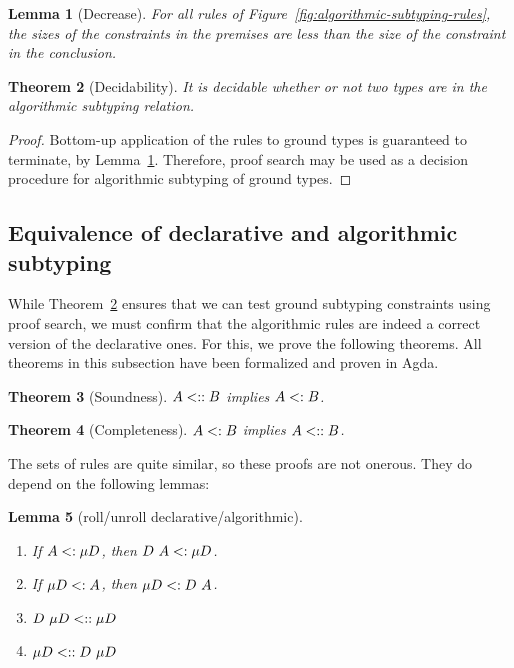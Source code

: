 \documentclass[pdflatex,sn-mathphys-num]{sn-jnl}%
\theoremstyle{thmstyleone}%
\newtheorem{theorem}{Theorem}%
\newtheorem{lemma}[theorem]{Lemma}%
\theoremstyle{thmstyletwo}%
\theoremstyle{thmstylethree}%
\begin{document}
\begin{lemma}[Decrease]
  \label{lem:decrease}
  For all rules of Figure~\ref{fig:algorithmic-subtyping-rules}, the sizes
  of the constraints in the premises are less than the size of the constraint
  in the conclusion.
\end{lemma}

\begin{theorem}[Decidability]
  \label{thm:dec}
  It is decidable whether or not two types are in the algorithmic subtyping
  relation.
\end{theorem}
\begin{proof}
  Bottom-up application of the rules to ground types is guaranteed to terminate,
  by Lemma~\ref{lem:decrease}.  Therefore, proof search may be used as a decision
  procedure for algorithmic subtyping of ground types.
\end{proof}

\subsection{Equivalence of declarative and algorithmic subtyping}
\label{sec:equiv}

While Theorem~\ref{thm:dec} ensures that we can test ground subtyping
constraints using proof search, we must confirm that the algorithmic
rules are indeed a correct version of the declarative ones.  For this,
we prove the following theorems.  All theorems in this subsection have
been formalized and proven in Agda.

\begin{theorem}[Soundness]
  $A \mathrel{<::} B$ implies $A \mathrel{<:} B$.
\end{theorem}

\begin{theorem}[Completeness]
  \label{thm:completeness}
  $A \mathrel{<:} B$ implies $A \mathrel{<::} B$.
\end{theorem}

\noindent The sets of rules are quite similar, so these proofs are not onerous.  They do depend on the following
lemmas:

\begin{lemma}[roll/unroll declarative/algorithmic]
  \

  \begin{enumerate}
    \item If $A \mathrel{<:} \mu D$, then $D ~ A \mathrel{<:} \mu D$.
\item  If $\mu D \mathrel{<:} A$, then $\mu D \mathrel{<:} D ~ A$.
\item  $D ~ \mu D \mathrel{<::} \mu D$
\item  $\mu D \mathrel{<::} D ~ \mu D$
\end{enumerate}
\end{lemma}
\end{document}
